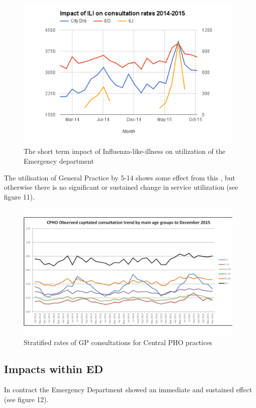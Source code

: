\documentclass[11pt,a4paper]{article}
\begin{document}
\begin{figure}[htp]
\centering
\includegraphics[scale=0.50]{ILI.png}
\caption{The short term impact of Influenza-like-illness on utilization of the Emergency department}
\label{Impact of Influenza-like-illness}
\end{figure}

The utilisation of General Practice by 5-14 shows some effect from this , but otherwise there is no significant or sustained change in service utilization (see figure 11).\\

\begin{figure}[htp]
\centering
\includegraphics[scale=0.30]{U13one.png}
\caption{Stratified rates of GP consultations for Central PHO practices}
\label{Age stratified General Practice consultations}
\end{figure}

\subsection{Impacts within ED}
In contract the Emergency Department showed an immediate and sustained effect (see figure 12).\\
\end{document}
